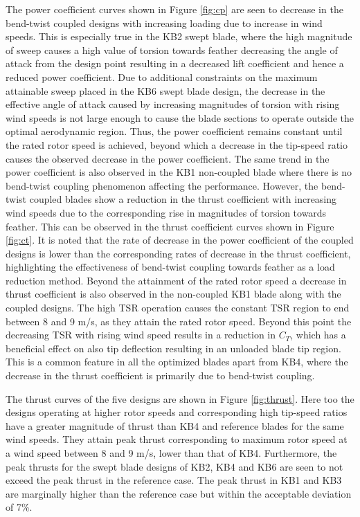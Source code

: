 The power coefficient curves shown in Figure \ref{fig:cp} are seen to decrease in the bend-twist coupled designs with increasing loading due to increase in wind speeds. This is especially true in the KB2 swept blade, where the high magnitude of sweep causes a high value of torsion towards feather decreasing the angle of attack from the design point resulting in a decreased lift coefficient and hence a reduced power coefficient. Due to additional constraints on the maximum attainable sweep placed in the KB6 swept blade design, the decrease in the effective angle of attack caused by increasing magnitudes of torsion with rising wind speeds is not large enough to cause the blade sections to operate outside the optimal aerodynamic region. Thus, the power coefficient remains constant until the rated rotor speed is achieved, beyond which a decrease in the tip-speed ratio causes the observed decrease in the power coefficient. The same trend in the power coefficient is also observed in the KB1 non-coupled blade where there is no bend-twist coupling phenomenon affecting the performance. However, the bend-twist coupled blades show a reduction in the thrust coefficient with increasing wind speeds due to the corresponding rise in magnitudes of torsion towards feather. This can be observed in the thrust coefficient curves shown in Figure \ref{fig:ct}. It is noted that the rate of decrease in the power coefficient of the coupled designs is lower than the corresponding rates of decrease in the thrust coefficient, highlighting the effectiveness of bend-twist coupling towards feather as a load reduction method. Beyond the attainment of the rated rotor speed a decrease in thrust coefficient is also observed in the non-coupled KB1 blade along with the coupled designs. The high TSR operation causes the constant TSR region to end between 8 and 9 m/s, as they attain the rated rotor speed. Beyond this point the decreasing TSR with rising wind speed results in a reduction in $C_T$, which has a beneficial effect on also tip deflection resulting in an unloaded blade tip region. This is a common feature in all the optimized blades apart from KB4, where the decrease in the thrust coefficient is primarily due to bend-twist coupling.         

The thrust curves of the five designs are shown in Figure \ref{fig:thrust}. Here too the designs operating at higher rotor speeds and corresponding high tip-speed ratios have a greater magnitude of thrust than KB4 and reference blades for the same wind speeds. They attain peak thrust corresponding to maximum rotor speed at a wind speed between 8 and 9 m/s, lower than that of KB4. Furthermore, the peak thrusts for the swept blade designs of KB2, KB4 and KB6 are seen to not exceed the peak thrust in the reference case. The peak thrust in KB1 and KB3 are marginally higher than the reference case but within the acceptable deviation of 7\%.

